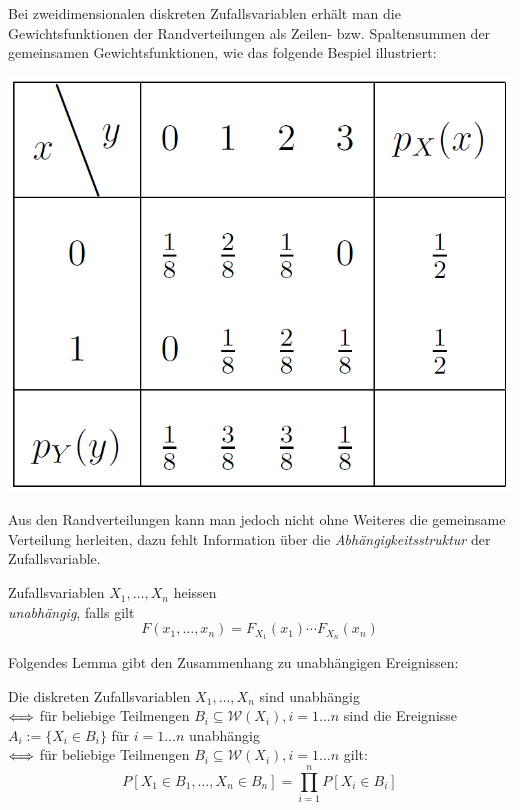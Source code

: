 Bei zweidimensionalen diskreten Zufallsvariablen erhält man die Gewichtsfunktionen der Randverteilungen als Zeilen- bzw. Spaltensummen der gemeinsamen Gewichtsfunktionen, wie das folgende Bespiel illustriert:
\begin{center}
\includegraphics[scale=0.44]{images/randverteilung.png}
\end{center}
Aus den Randverteilungen kann man jedoch nicht ohne Weiteres die gemeinsame Verteilung herleiten, dazu fehlt Information über die \textit{Abhängigkeitsstruktur} der Zufallsvariable.

\begin{definition}
Zufallsvariablen $X_1,\dots, X_n$ heissen \\ \textit{unabhängig}, falls gilt
$$ F(x_1, \dots, x_n) = F_{X_1}(x_1) \cdots F_{X_n}(x_n)$$
\end{definition}
Folgendes Lemma gibt den Zusammenhang zu unabhängigen Ereignissen:
\begin{lemma}
Die diskreten Zufallsvariablen $X_1,\dots, X_n$ sind unabhängig\\ 
$\Longleftrightarrow$ für beliebige Teilmengen $B_i \subseteq \mathcal{W}(X_i), i = 1\dots n$ sind die Ereignisse $A_i := \{X_i \in B_i\}$ für $i= 1\dots n$ unabhängig \\
$\Longleftrightarrow$ für beliebige Teilmengen $B_i \subseteq \mathcal{W}(X_i), i = 1\dots n$ gilt:
$$ P[X_1 \in B_1, \dots, X_n \in B_n] = \prod_{i=1}^n P[X_i \in B_i]$$
\end{lemma}

